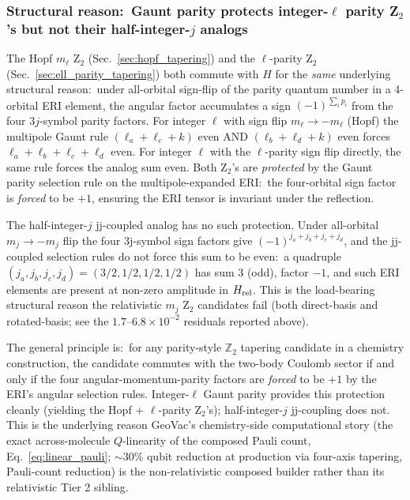 \documentclass[aps,pra,twocolumn,superscriptaddress,longbibliography]{revtex4-2}
\begin{document}
\subsubsection{Structural reason:\ Gaunt parity protects integer-$\ell$
parity Z$_2$'s but not their half-integer-$j$ analogs}
\label{sec:gaunt_parity_protection}

The Hopf $m_\ell$ Z$_2$ (Sec.~\ref{sec:hopf_tapering}) and the
$\ell$-parity Z$_2$ (Sec.~\ref{sec:ell_parity_tapering}) both
commute with $H$ for the \emph{same} underlying structural reason:\
under all-orbital sign-flip of the parity quantum number in a
4-orbital ERI element, the angular factor accumulates a sign
$(-1)^{\sum_i p_i}$ from the four $3j$-symbol parity factors.  For
integer $\ell$ with sign flip $m_\ell \to -m_\ell$ (Hopf) the
multipole Gaunt rule $(\ell_a + \ell_c + k)$ even AND
$(\ell_b + \ell_d + k)$ even forces $\ell_a + \ell_b + \ell_c + \ell_d$
even.  For integer $\ell$ with the $\ell$-parity sign flip directly,
the same rule forces the analog sum even.  Both Z$_2$'s are
\emph{protected} by the Gaunt parity selection rule on the
multipole-expanded ERI:\ the four-orbital sign factor is
\emph{forced} to be $+1$, ensuring the ERI tensor is invariant
under the reflection.

The half-integer-$j$ jj-coupled analog has no such protection.
Under all-orbital $m_j \to -m_j$ flip the four 3j-symbol sign
factors give $(-1)^{j_a + j_b + j_c + j_d}$, and the jj-coupled
selection rules do not force this sum to be even:\ a quadruple
$(j_a, j_b, j_c, j_d) = (3/2, 1/2, 1/2, 1/2)$ has sum $3$ (odd),
factor $-1$, and such ERI elements are present at non-zero
amplitude in $H_{\rm rel}$.  This is the load-bearing structural
reason the relativistic $m_j$ Z$_2$ candidates fail (both
direct-basis and rotated-basis; see the $1.7$--$6.8 \times 10^{-2}$
residuals reported above).

The general principle is:\ for any parity-style $\mathbb{Z}_2$
tapering candidate in a chemistry construction, the candidate
commutes with the two-body Coulomb sector if and only if the four
angular-momentum-parity factors are \emph{forced} to be $+1$ by the
ERI's angular selection rules.  Integer-$\ell$ Gaunt parity
provides this protection cleanly (yielding the Hopf + $\ell$-parity
Z$_2$'s); half-integer-$j$ jj-coupling does not.  This is the
underlying reason GeoVac's chemistry-side computational story
(the exact across-molecule $Q$-linearity of the composed Pauli
count, Eq.~\eqref{eq:linear_pauli}; $\sim 30\%$ qubit reduction at
production via four-axis tapering, Pauli-count reduction) is the
non-relativistic composed builder rather than its relativistic
Tier 2 sibling.
\end{document}

